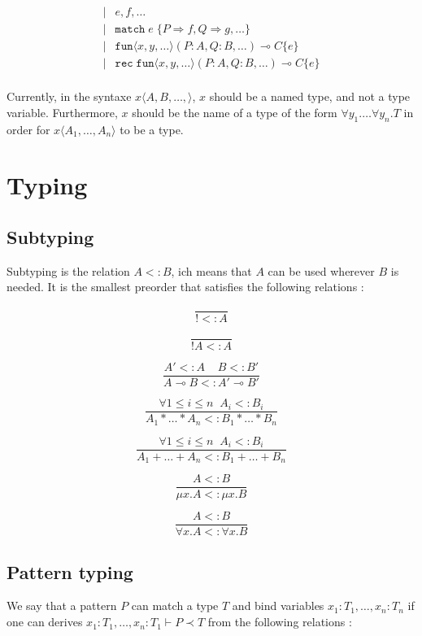 \documentclass{scrartcl}
\newcommand{\linimp}{\multimap}
\newcommand{\subtype}{<\!:}
\begin{document}
\begin{minipage}[t]{1cm}
\begin{align*}
    | & e, f, \dots                                                                                      \\
    | & \mathtt{match}\;e\;\{ P \Rightarrow f, Q \Rightarrow g, \dots \}                                 \\
    | & \mathtt{fun} \langle x, y, \dots \rangle (P : A, Q : B, \dots) \multimap C \{ e \}               \\
    | & \mathtt{rec}\;\mathtt{fun} \langle x, y, \dots \rangle (P : A, Q : B, \dots) \multimap C \{ e \} \\
  \end{align*}
\end{minipage}

Currently, in the syntaxe $x \langle A, B, \dots, \rangle$, $x$ should be a named type, and not
a type variable. Furthermore, $x$ should be the name of a type of the form
$\forall y_1. \dots \forall y_n. T$ in order for $x \langle A_1, \dots, A_n \rangle$ to be a type.

\section{Typing}

\subsection{Subtyping}
Subtyping is the relation $A \subtype B$, ich means that $A$ can be
used wherever $B$ is needed. It is the smallest preorder that satisfies the following relations :

\[
  \frac{}{! \subtype A}
\]

\[
  \frac{}{!A \subtype A}
\]

\[
  \frac{A' \subtype A \;\;\;\; B \subtype B'}{A \linimp B \subtype A' \linimp B'}
\]

\[
  \frac{\forall 1 \leq i \leq n \;\; A_i \subtype B_i}{A_1 * \dots * A_n \subtype B_1 * \dots * B_n}
\]

\[
  \frac{\forall 1 \leq i \leq n \;\; A_i \subtype B_i}{A_1 + \dots + A_n \subtype B_1 + \dots + B_n}
\]

\[
  \frac{A \subtype B}{\mu x. A \subtype \mu x. B}
\]

\[
  \frac{A \subtype B}{\forall x. A \subtype \forall x. B}
\]

\subsection{Pattern typing}
We say that a pattern $P$ can match a type $T$ and bind variables $x_1: T_1, \dots, x_n: T_n$
if one can derives $x_1: T_1, \dots, x_n: T_1 \vdash P \prec T$ from the following relations :
\end{document}

